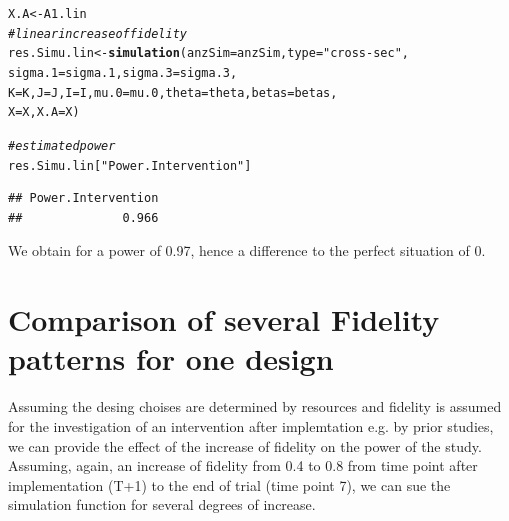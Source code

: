 \documentclass{article}\usepackage[]{graphicx}\usepackage[]{color}
\makeatletter
\newcommand{\hlstr}[1]{\textcolor[rgb]{0.192,0.494,0.8}{#1}}%
\newcommand{\hlcom}[1]{\textcolor[rgb]{0.678,0.584,0.686}{\textit{#1}}}%
\newcommand{\hlstd}[1]{\textcolor[rgb]{0.345,0.345,0.345}{#1}}%
\newcommand{\hlkwb}[1]{\textcolor[rgb]{0.69,0.353,0.396}{#1}}%
\newcommand{\hlkwc}[1]{\textcolor[rgb]{0.333,0.667,0.333}{#1}}%
\newcommand{\hlkwd}[1]{\textcolor[rgb]{0.737,0.353,0.396}{\textbf{#1}}}%
\newenvironment{kframe}{%
 \def\at@end@of@kframe{}%
 \ifinner\ifhmode%
  \def\at@end@of@kframe{\end{minipage}}%
  \begin{minipage}{\columnwidth}%
 \fi\fi%
 \def\FrameCommand##1{\hskip\@totalleftmargin \hskip-\fboxsep
 \colorbox{shadecolor}{##1}\hskip-\fboxsep
     \hskip-\linewidth \hskip-\@totalleftmargin \hskip\columnwidth}%
 \MakeFramed {\advance\hsize-\width
   \@totalleftmargin\z@ \linewidth\hsize
   \@setminipage}}%
 {\par\unskip\endMakeFramed%
 \at@end@of@kframe}
\newenvironment{knitrout}{}{} %
\makeatother
\begin{document}
\begin{knitrout}
\color{fgcolor}\begin{kframe}
\begin{alltt}
\hlstd{X.A}\hlkwb{<-}\hlstd{A1.lin}
\hlcom{#linear increase of fidelity}
\hlstd{res.Simu.lin}\hlkwb{<-}\hlkwd{simulation}\hlstd{(}\hlkwc{anzSim}\hlstd{=anzSim,}\hlkwc{type}\hlstd{=}\hlstr{"cross-sec"}\hlstd{,}
                   \hlkwc{sigma.1}\hlstd{=sigma.1,}\hlkwc{sigma.3}\hlstd{=sigma.3,}
                   \hlkwc{K}\hlstd{=K,}\hlkwc{J}\hlstd{=J,}\hlkwc{I}\hlstd{=I,}\hlkwc{mu.0}\hlstd{=mu.0,} \hlkwc{theta}\hlstd{=theta,}\hlkwc{betas}\hlstd{=betas,}
                   \hlkwc{X}\hlstd{=X,} \hlkwc{X.A}\hlstd{=X)}

\hlcom{#estimated power}
\hlstd{res.Simu.lin[}\hlstr{"Power.Intervention"}\hlstd{]}
\end{alltt}
\begin{verbatim}
## Power.Intervention 
##              0.966
\end{verbatim}
\end{kframe}
\end{knitrout}

 We obtain for a power of 0.97, hence a difference to the perfect situation of 
 0.

\section{Comparison of several Fidelity patterns for one design}

Assuming the desing choises are determined by resources and fidelity is assumed for the investigation of an intervention after implemtation e.g. by prior studies, we can provide the effect of the increase of fidelity on the power of the study.
Assuming, again, an increase of fidelity from 0.4 to 0.8 from time point after implementation (T+1) to the end of trial (time point 7), we can sue the simulation function for several degrees of increase.
\end{document}
